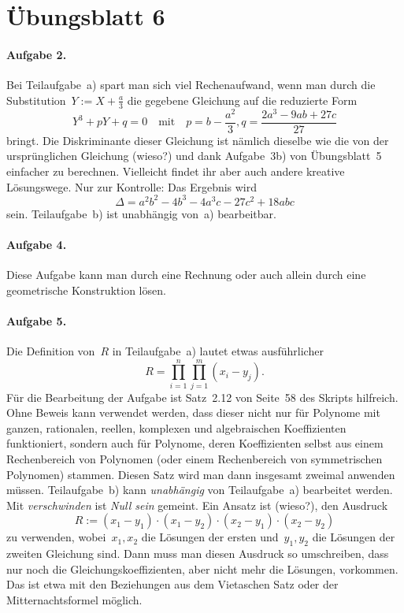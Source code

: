 \documentclass{../algblatt}
\begin{document}
\section*{Übungsblatt 6}

\paragraph{Aufgabe 2.} Bei Teilaufgabe~a) spart man sich viel Rechenaufwand,
wenn man durch die Substitution~$Y := X + \frac{a}{3}$ die gegebene Gleichung
auf die reduzierte Form
\[ Y^3 + pY + q = 0 \quad\text{mit}\quad
  p = b - \frac{a^2}{3}, q = \frac{2a^3 - 9ab + 27c}{27} \]
bringt. Die Diskriminante dieser Gleichung ist nämlich dieselbe wie die von der
ursprünglichen Gleichung (wieso?) und dank Aufgabe~3b) von Übungsblatt~5
einfacher zu berechnen. Vielleicht findet ihr aber auch andere kreative
Lösungswege. Nur zur Kontrolle: Das Ergebnis wird
\[ \Delta = a^2b^2 - 4b^3 - 4a^3c - 27c^2 + 18abc \]
sein. Teilaufgabe~b) ist unabhängig von~a) bearbeitbar.

\paragraph{Aufgabe 4.} Diese Aufgabe kann man durch eine Rechnung oder auch
allein durch eine geometrische Konstruktion lösen.

\paragraph{Aufgabe 5.} Die Definition von~$R$ in Teilaufgabe~a) lautet etwas
ausführlicher
\[ R = \prod_{i=1}^n \prod_{j=1}^m (x_i - y_j). \]
Für die Bearbeitung der Aufgabe ist Satz~2.12 von Seite~58 des Skripts
hilfreich. Ohne Beweis kann verwendet werden, dass dieser nicht nur für
Polynome mit ganzen, rationalen, reellen, komplexen und algebraischen
Koeffizienten funktioniert, sondern auch für Polynome, deren Koeffizienten
selbst aus einem Rechenbereich von Polynomen (oder einem Rechenbereich von
symmetrischen Polynomen) stammen. Diesen Satz wird man dann insgesamt zweimal
anwenden müssen. Teilaufgabe~b) kann \emph{unabhängig} von Teilaufgabe~a)
bearbeitet werden. Mit \emph{verschwinden} ist \emph{Null sein} gemeint. Ein
Ansatz ist (wieso?), den Ausdruck
\[ R := (x_1 - y_1) \cdot (x_1 - y_2) \cdot (x_2 - y_1) \cdot (x_2 - y_2) \]
zu verwenden, wobei~$x_1,x_2$ die Lösungen der ersten und~$y_1,y_2$ die
Lösungen der zweiten Gleichung sind. Dann muss man diesen Ausdruck so
umschreiben, dass nur noch die Gleichungskoeffizienten, aber nicht mehr die
Lösungen, vorkommen. Das ist etwa mit den Beziehungen aus dem Vietaschen Satz
oder der Mitternachtsformel möglich.
\end{document}
